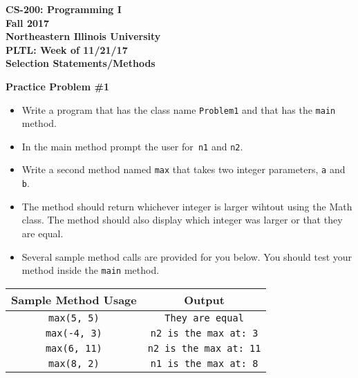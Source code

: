 \documentclass[12pt]{article}
\begin{document}
\begin{center}
	\textbf{CS-200: Programming I}\\
	\textbf{Fall 2017}\\
	\textbf{Northeastern Illinois University}\\
	\textbf{PLTL: Week of 11/21/17}\\
	\textbf{Selection Statements/Methods}
\end{center}

\noindent\textbf{Practice Problem \#1}
\begin{itemize}
	\item Write a program that has the class name \texttt{Problem1} and that has the \texttt{main} method.
	\item In the main method prompt the user for\texttt{ n1} and \texttt{n2}.
	\item Write a second method named \texttt{max} that takes two integer parameters, \texttt{a} and \texttt{b}.
	\item The method should return whichever integer is larger wihtout using the Math class. The method should also display which integer was larger or that they are equal.
	\item Several sample method calls are provided for you below. You should test your method inside the \texttt{main} method.
\end{itemize}
\begin{center}
\begin{tabular}{| c | c |}
\hline\rule{0pt}{4ex}
Sample Method Usage & Output \\
\hline\rule{0pt}{4ex}
\texttt{max(5, 5)} & \texttt{They are equal}\\
\hline\rule{0pt}{4ex}
\texttt{max(-4, 3)} & \texttt{n2 is the max at: 3}\\
\hline\rule{0pt}{4ex}
\texttt{max(6, 11)} & \texttt{n2 is the max at: 11}\\
\hline\rule{0pt}{5ex}
\texttt{max(8, 2)} & \texttt{n1 is the max at: 8}\\
\hline
\end{tabular}
\end{center}
\end{document}
